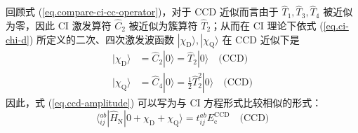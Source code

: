 回顾式 (\ref{eq.compare-ci-cc-operator})，对于 CCD 近似而言由于 $\hat T_1, \hat T_3, \hat T_4$ 被近似为零，因此 CI 激发算符 $\hat C_2$ 被近似为簇算符 $\hat T_2$；从而在 CI 理论下依式 (\ref{eq.ci-chi-d}) 所定义的二次、四次激发波函数 $| \chi_\mathrm{D} \rangle, | \chi_\mathrm{Q} \rangle$ 在 CCD 近似下是
\begin{align}
  | \chi_\mathrm{D} \rangle &= \hat C_2 | 0 \rangle = \hat T_2 | 0 \rangle \quad \text{(CCD)} \\
  | \chi_\mathrm{Q} \rangle &= \hat C_4 | 0 \rangle = \frac{1}{2} \hat T_2^2 | 0 \rangle \quad \text{(CCD)}
\end{align}
因此，式 (\ref{eq.ccd-amplitude}) 可以写为与 CI 方程形式比较相似的形式：
\begin{equation}
  \label{eq.ccd-amplitude-by-ci}
  \langle {}_{ij}^{ab} | \hat H_\mathrm{N} | 0 + \chi_\mathrm{D} + \chi_\mathrm{Q} \rangle = t_{ij}^{ab} E_\mathrm{c}^\mathrm{CCD} \quad \text{(CCD)}
\end{equation}

